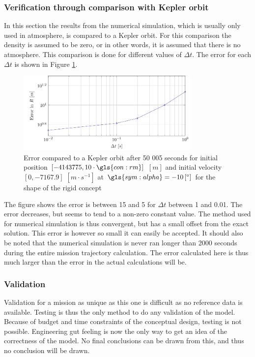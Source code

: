 \subsubsection{Verification through comparison with Kepler orbit}
\label{sec:astroverf}

In this section the results from the numerical simulation, which is usually only used in atmosphere, is compared to a Kepler orbit. For this comparison the density is assumed to be zero, or in other words, it is assumed that there is no atmosphere. This comparison is done for different values of $\Delta t$. The error for each $\Delta t$ is shown in Figure \ref{fig:kep_error}.

\begin{figure}[ht]
	\centering
	\includegraphics[width=0.8\textwidth]{Figure/orbit/num_kep.pdf}
	\caption[Error compared to a Kepler orbit]{Error compared to a Kepler orbit after 50 005 seconds for initial position $\left[-4143775,10\cdot\gls{con:rm}\right]$ $\left[m\right]$ and initial velocity $\left[0,-7167.9\right]$ $\left[m\cdot s^{-1} \right]$ at $\gls{sym:alpha}=-10\left[^\circ\right]$ for the shape of the rigid concept}
	\label{fig:kep_error}
\end{figure}

The figure shows the error is between 15 and 5 for $\Delta t$ between 1 and 0.01. The error decreases, but seems to tend to a non-zero constant value. The method used for numerical simulation is thus convergent, but has a small offset from the exact solution. This error is however so small it can easily be accepted. It should also be noted that the numerical simulation is never ran longer than 2000 seconds during the entire mission trajectory calculation. The error calculated here is thus much larger than the error in the actual calculations will be.

\subsubsection{Validation}
\label{sec:astroval}

Validation for a mission as unique as this one is difficult as no reference data is available. Testing is thus the only method to do any validation of the model. Because of budget and time constraints of the conceptual design, testing is not possible. Engineering gut feeling is now the only way to get an idea of the correctness of the model. No final conclusions can be drawn from this, and thus no conclusion will be drawn.